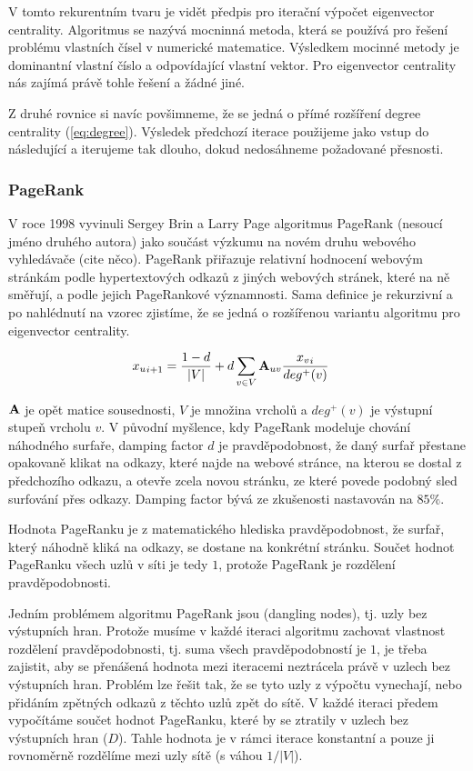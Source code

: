 \documentclass{bakalarka}
\begin{document}
V tomto rekurentním tvaru je vidět předpis pro iterační výpočet eigenvector
centrality. Algoritmus se nazývá mocninná metoda, která se používá pro řešení
problému vlastních čísel v numerické matematice. Výsledkem mocinné metody je
dominantní vlastní číslo a odpovídající vlastní vektor. Pro eigenvector
centrality nás zajímá právě tohle řešení a žádné jiné.

Z druhé rovnice si navíc povšimneme, že se jedná o přímé rozšíření degree
centrality (\ref{eq:degree}). Výsledek předchozí iterace použijeme jako vstup
do následující a iterujeme tak dlouho, dokud nedosáhneme požadované přesnosti.

\subsubsection{PageRank}
V roce 1998 vyvinuli Sergey Brin a Larry Page algoritmus PageRank (nesoucí
jméno druhého autora) jako součást výzkumu na novém druhu webového vyhledávače
(cite něco). PageRank přiřazuje relativní hodnocení webovým stránkám podle
hypertextových odkazů z jiných webových stránek, které na ně směřují, a podle
jejich PageRankové významnosti. Sama definice je rekurzivní a po nahlédnutí na
vzorec zjistíme, že se jedná o rozšířenou variantu algoritmu pro eigenvector
centrality.

\begin{align}
{x_u}_{i + 1} &= \frac{1 - d}{|V|} + d \displaystyle\sum_{v \in V} {\bf A}_{uv}
\frac{{x_v}_{i}}{deg^+ (v)}
\end{align}

${\bf A}$ je opět matice sousednosti, $V$ je množina vrcholů a $deg^+(v)$ je
výstupní stupeň vrcholu $v$.  V původní myšlence, kdy PageRank modeluje chování
náhodného surfaře, damping factor $d$ je pravděpodobnost, že daný surfař
přestane opakovaně klikat na odkazy, které najde na webové stránce, na kterou
se dostal z předchozího odkazu, a otevře zcela novou stránku, ze které povede
podobný sled surfování přes odkazy.  Damping factor bývá ze zkušenosti
nastavován na $85\%$.

Hodnota PageRanku je z matematického hlediska pravděpodobnost, že surfař, který
náhodně kliká na odkazy, se dostane na konkrétní stránku. Součet hodnot
PageRanku všech uzlů v síti je tedy $1$, protože PageRank je rozdělení
pravděpodobnosti.

Jedním problémem algoritmu PageRank jsou  (dangling nodes), tj.
uzly bez výstupních hran. Protože musíme v každé iteraci algoritmu zachovat
vlastnost rozdělení pravděpodobnosti, tj. suma všech pravděpodobností je $1$,
je třeba zajistit, aby se přenášená hodnota mezi iteracemi neztrácela právě v
uzlech bez výstupních hran. Problém lze řešit tak, že se tyto uzly z výpočtu
vynechají, nebo přidáním zpětných odkazů z těchto uzlů zpět do sítě.  V každé
iteraci předem vypočítáme součet hodnot PageRanku, které by se ztratily v
uzlech bez výstupních hran ($D$). Tahle hodnota je v rámci iterace konstantní a
pouze ji rovnoměrně rozdělíme mezi uzly sítě (s váhou $1/|V|$).
\end{document}
